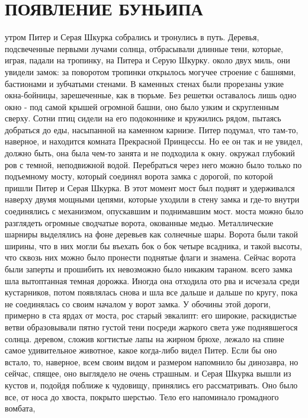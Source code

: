 \chapter{ПОЯВЛЕНИЕ БУНЬИПА}
 утром Питер и Серая Шкурка собрались и тронулись в путь. 
Деревья, подсвеченные первыми лучами солнца, отбрасывали длинные тени, 
которые, играя, падали на тропинку, на Питера и Серую Шкурку.
 около двух миль, они увидели замок: за поворотом тропинки 
открылось могучее строение с башнями, бастионами и зубчатыми стенами. 
В каменных стенах были прорезаны узкие окна-бойницы, зарешеченные, как 
в тюрьме. Без решетки оставалось лишь одно окно - под самой крышей 
огромной башни, оно было узким и скругленным сверху. Сотни птиц сидели 
на его подоконнике и кружились рядом, пытаясь добраться до еды, 
насыпанной на каменном карнизе. Питер подумал, что там-то, наверное, и 
находится комната Прекрасной Принцессы. Но ее он так и не увидел, 
должно быть, она была чем-то занята и не подходила к окну.
 окружал глубокий ров с темной, неподвижной водой. 
Перебраться через него можно было только по подъемному мосту, который 
соединял ворота замка с дорогой, по которой пришли Питер и Серая 
Шкурка. В этот момент мост был поднят и удерживался наверху двумя 
мощными цепями, которые уходили в стену замка и где-то внутри 
соединялись с механизмом, опускавшим и поднимавшим мост.
 моста можно было разглядеть огромные сводчатые ворота, 
окованные медью. Металлические шарниры выделялись на фоне деревьев как 
солнечные шары. Ворота были такой ширины, что в них могли бы въехать 
бок о бок четыре всадника, и такой высоты, что сквозь них можно было 
пронести поднятые флаги и знамена. Сейчас ворота были заперты и 
прошибить их невозможно было никаким тараном.
 всего замка шла вытоптанная темная дорожка. Иногда она 
отходила ото рва и исчезала среди кустарников, потом появлялась снова 
и шла все дальше и дальше по кругу, пока не соединялась со своим 
началом у ворот замка. У обочины этой дороги, примерно в ста ярдах от 
моста, рос старый эвкалипт: его широкие, раскидистые ветви 
образовывали пятно густой тени посреди жаркого света уже поднявшегося 
солнца.
 деревом, сложив когтистые лапы на жирном брюхе, лежало на 
спине самое удивительное животное, какое когда-либо видел Питер. Если 
бы оно встало, то, наверное, всем своим видом и размером напомнило бы 
динозавра, но сейчас, спящее, оно выглядело не очень страшным.
 и Серая Шкурка вышли из кустов и, подойдя поближе к 
чудовищу, принялись его рассматривать. Оно было все, от носа до 
хвоста, покрыто шерстью. Тело его напоминало громадного вомбата, 
